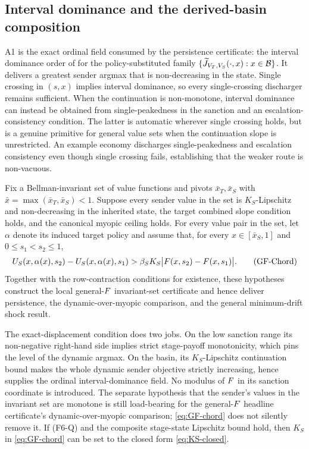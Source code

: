 \subsection{Interval dominance and the derived-basin composition}

\begin{remark}
\label{rem:ido}
A1 is the exact ordinal field consumed by the persistence certificate:
the interval dominance order of \citet{QuahStrulovici2009} for the
policy-substituted family
$\{\widetilde J_{V_T,V_S}(\cdot,x):x\in\mathcal{B}\}$. It delivers a
greatest sender argmax that is non-decreasing in the state. Single
crossing in $(s,x)$ implies interval dominance, so every
single-crossing discharger remains sufficient. When the
continuation is non-monotone, interval dominance can instead be
obtained from single-peakedness in the sanction and an
escalation-consistency condition. The latter is automatic wherever
single crossing holds, but is a genuine primitive for general
value sets when the continuation slope is unrestricted. An example
economy discharges single-peakedness and escalation consistency even
though single crossing fails, establishing that the weaker route is
non-vacuous.
\end{remark}

\begin{proposition}
\label{prop:F-chord-route}
Fix a Bellman-invariant set of value functions and pivots
$\bar x_T,\bar x_S$ with $\bar x=\max(\bar x_T,\bar x_S)<1$.
Suppose every sender value in the set is $K_S$-Lipschitz and
non-decreasing in the inherited state, the target combined slope condition holds,
and the canonical myopic ceiling holds. For every value pair in the set, let
$\alpha$ denote its induced target policy and assume that, for every
$x\in[\bar x_S,1]$ and $0\le s_1<s_2\le1$,
\[
U_S(x,\alpha(x),s_2)-U_S(x,\alpha(x),s_1)
>
\beta_S K_S\bigl|F(x,s_2)-F(x,s_1)\bigr|.
\tag{GF-Chord}\label{eq:GF-chord}
\]
Together with the row-contraction conditions for existence, these
hypotheses construct the local general-$F$ invariant-set certificate and
hence deliver persistence, the dynamic-over-myopic comparison, and the
general minimum-drift shock result.
\end{proposition}

The exact-displacement condition does two jobs. On the low sanction range its
non-negative right-hand side implies strict stage-payoff monotonicity,
which pins the level of the dynamic argmax. On the basin, its
$K_S$-Lipschitz continuation bound makes the whole dynamic sender
objective strictly increasing, hence supplies the ordinal
interval-dominance field. No modulus of $F$ in its sanction coordinate
is introduced. The separate hypothesis that the sender's values in the invariant set are monotone is
still load-bearing for the general-$F$ headline certificate's
dynamic-over-myopic comparison; \eqref{eq:GF-chord} does not silently
remove it. If \textup{(F6-Q)} and the composite stage-state Lipschitz
bound hold, then $K_S$ in \eqref{eq:GF-chord} can be set to the closed
form \eqref{eq:KS-closed}.

